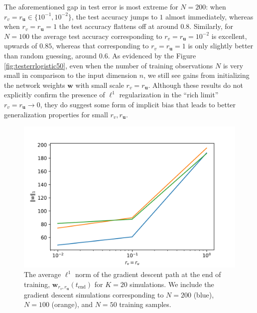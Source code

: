 \documentclass{article}
\begin{document}
The aforementioned gap in test error is most extreme for $N = 200$: when $r_v = r_{\boldsymbol{u}} \in \{10^{-1}, 10^{-2} \}$, the test accuracy jumps to $1$ almost immediately, whereas when $r_v = r_{\boldsymbol{u}} = 1$ the test accuracy flattens off at around $0.8$. Similarly, for $N=100$ the average test accuracy corresponding to $r_v = r_{\boldsymbol{u}} = 10^{-2}$ is excellent, upwards of $0.85$, whereas that corresponding to $r_v = r_{\boldsymbol{u}} = 1$ is only slightly better than random guessing, around $0.6$. As evidenced by the Figure \ref{fig:testerrlogistic50}, even when the number of training observations $N$ is very small in comparison to the input dimension $n$, we still see gains from initializing the network weights $\boldsymbol{w}$ with small scale $r_v = r_{\boldsymbol{u}}$. Although these results do not explicitly confirm the presence of $\ell^1$ regularization in the \enquote{rich limit} $r_v = r_{\boldsymbol{u}} \rightarrow 0$, they do suggest some form of implicit bias that leads to better generalization properties for small $r_v, r_{\boldsymbol{u}}$.

\begin{figure}[H]
    \centering
    \includegraphics{Imgs/Sparse Logistic Regression/param_l1_avg.png}
    \caption{The average $\ell^1$ norm of the gradient descent path at the end of training, $\boldsymbol{w}_{r_v, r_{\boldsymbol{u}}}(t_{\text{end}})$ for $K=20$ simulations. We include the gradient descent simulations corresponding to $N=200$ (blue), $N=100$ (orange), and $N=50$ training samples.}
    \label{fig:solutionl1logistic}
\end{figure}
\end{document}
